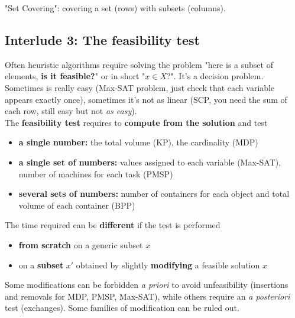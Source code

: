 "Set Covering": covering a set (rows) with subsets (columns).\\

\newpage

\subsection*{Interlude 3: The feasibility test}
Often heuristic algorithms require solving the problem "here is a subset of elements, \textbf{is it feasible?}" or in short "$x \in X$?". It's a decision problem.\\

Sometimes is really easy (Max-SAT problem, just check that each variable appears exactly once), sometimes it's not as linear (SCP, you need the sum of each row, still easy but not \textit{as easy}).\\

The \textbf{feasibility test} requires to \textbf{compute from the solution} and test
\begin{itemize}
	\item \textbf{a single number:} the total volume (KP), the cardinality (MDP)
	\item \textbf{a single set of numbers:} values assigned to each variable (Max-SAT), number of machines for each task (PMSP)
	\item \textbf{several sets of numbers:} number of containers for each object and total volume of each container (BPP)
\end{itemize}
\nn

The time required can be \textbf{different} if the test is performed
\begin{itemize}
	\item \textbf{from scratch} on a generic subset $x$
	\item on a \textbf{subset} $x'$ obtained by slightly \textbf{modifying} a feasible solution $x$
\end{itemize}
\nn

Some modifications can be forbidden \textit{a priori} to avoid unfeasibility (insertions and removals for MDP, PMSP, Max-SAT), while others require an \textit{a posteriori} test (exchanges). Some families of modification can be ruled out.\\


\newpage

